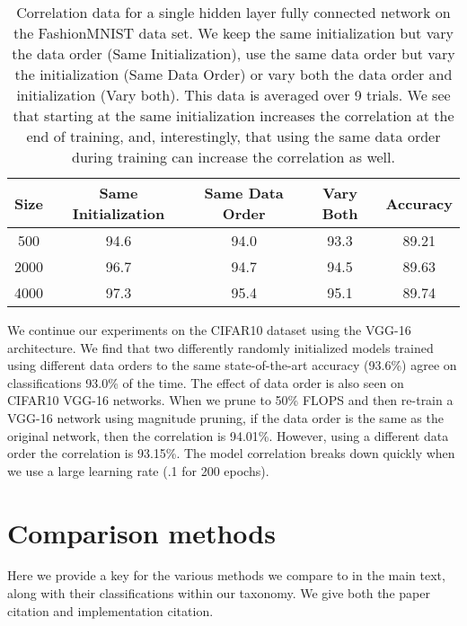\begin{table}[h!]
\begin{center}
 \begin{tabular}{||c c c c c||} 
 \hline
Size & Same Initialization & Same Data Order & Vary Both & Accuracy\\ [0.5ex] 
 \hline\hline
 500 & 94.6 & 94.0 & 93.3 & 89.21 \\ 
 \hline
 2000 & 96.7 & 94.7 & 94.5& 89.63\\
 \hline
 4000 & 97.3 & 95.4 & 95.1 &89.74\\
 \hline
\end{tabular}
\caption{Correlation data for a single hidden layer fully connected network on the FashionMNIST data set. We keep the same initialization but vary the data order (Same Initialization), use the same data order but vary the initialization (Same Data Order) or vary both the data order and initialization (Vary both). This data is averaged over 9 trials.  We see that starting at the same initialization increases the correlation at the end of training, and, interestingly, that using the same data order during training can increase the correlation as well. }
\end{center}
\end{table}
We continue our experiments on the CIFAR10 dataset using the VGG-16 architecture.  We find that two differently randomly initialized models trained using different data orders to  the same state-of-the-art accuracy (93.6\%) agree on classifications 93.0\% of the time.  The effect of data order is also seen on CIFAR10 VGG-16 networks.  When we prune to 50\% FLOPS and then re-train a VGG-16 network using magnitude pruning, if the data order is the same as the original network, then the correlation is 94.01\%.  However, using a different data order the correlation is 93.15\%. The model correlation breaks down quickly when we use a large learning rate (.1 for 200 epochs).  

\section{Comparison methods}
\label{app:sec:comparison_methods}
Here we provide a key for the various methods we compare to in the main text, along with their classifications within our taxonomy. %
We give both the paper citation and implementation citation.

